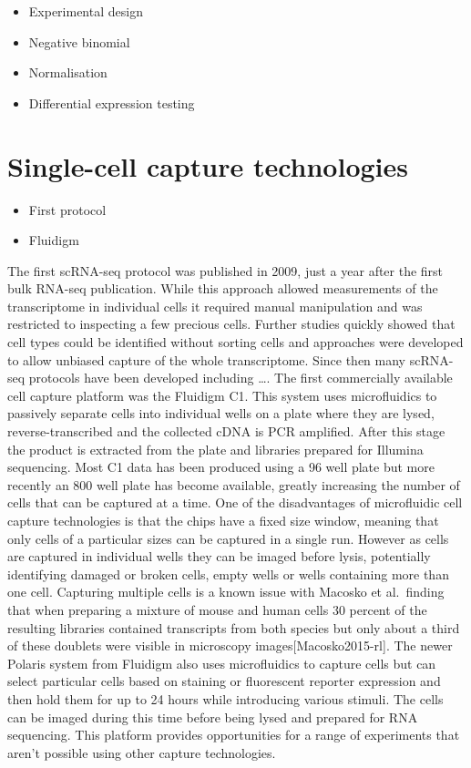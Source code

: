 \documentclass[11pt,a4paper,titlepage,twoside,openright]{style/unimelbthesis}
\theoremstyle{definition}
\theoremstyle{definition}
\theoremstyle{definition}
\theoremstyle{remark}
\begin{document}
\begin{mainmatter}
\begin{itemize}
\tightlist
\item
  Experimental design
\item
  Negative binomial
\item
  Normalisation
\item
  Differential expression testing
\end{itemize}

\hypertarget{single-cell-capture-technologies}{%
\section{Single-cell capture technologies}\label{single-cell-capture-technologies}}

\begin{itemize}
\tightlist
\item
  First protocol
\item
  Fluidigm
\end{itemize}

The first scRNA-seq protocol was published in 2009, just a year after the first bulk RNA-seq publication. While this approach allowed measurements of the transcriptome in individual cells it required manual manipulation and was restricted to inspecting a few precious cells. Further studies quickly showed that cell types could be identified without sorting cells and approaches were developed to allow unbiased capture of the whole transcriptome. Since then many scRNA-seq protocols have been developed including \ldots{}. The first commercially available cell capture platform was the Fluidigm C1. This system uses microfluidics to passively separate cells into individual wells on a plate where they are lysed, reverse-transcribed and the collected cDNA is PCR amplified. After this stage the product is extracted from the plate and libraries prepared for Illumina sequencing. Most C1 data has been produced using a 96 well plate but more recently an 800 well plate has become available, greatly increasing the number of cells that can be captured at a time. One of the disadvantages of microfluidic cell capture technologies is that the chips have a fixed size window, meaning that only cells of a particular sizes can be captured in a single run. However as cells are captured in individual wells they can be imaged before lysis, potentially identifying damaged or broken cells, empty wells or wells containing more than one cell. Capturing multiple cells is a known issue with Macosko et al.~finding that when preparing a mixture of mouse and human cells 30 percent of the resulting libraries contained transcripts from both species but only about a third of these doublets were visible in microscopy images{[}Macosko2015-rl{]}. The newer Polaris system from Fluidigm also uses microfluidics to capture cells but can select particular cells based on staining or fluorescent reporter expression and then hold them for up to 24 hours while introducing various stimuli. The cells can be imaged during this time before being lysed and prepared for RNA sequencing. This platform provides opportunities for a range of experiments that aren't possible using other capture technologies.


\end{mainmatter}
\end{document}
